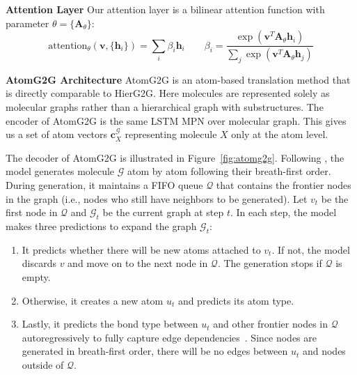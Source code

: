 \documentclass{article} \usepackage{iclr2020_conference,times}
\newcommand{\graph}{\mathcal{G}}
\newcommand{\attention}{\mathrm{attention}}
\newcommand{\set}[1]{\{ #1 \}}
\def\vc{{\bm{c}}}
\def\vh{{\bm{h}}}
\def\vv{{\bm{v}}}
\def\mA{{\bm{A}}}
\def\gQ{{\mathcal{Q}}}
\begin{document}
\textbf{Attention Layer } Our attention layer is a bilinear attention function with parameter $\theta=\set{\mA_\theta}$:
\begin{equation}
    \attention_{\theta}(\vv, \set{\vh_i}) = \sum_i \beta_i \vh_i  \qquad \beta_i = \frac{\exp(\vv^T \mA_\theta \vh_i)}{\sum_j \exp(\vv^T \mA_\theta \vh_j)}
\end{equation}

\textbf{AtomG2G Architecture } AtomG2G is an atom-based translation method that is directly comparable to HierG2G. Here molecules are represented solely as molecular graphs rather than a hierarchical graph with substructures. The encoder of AtomG2G is the same LSTM MPN over molecular graph. This gives us a set of atom vectors $\vc_X^\graph$ representing molecule $X$ only at the atom level.

The decoder of AtomG2G is illustrated in Figure~\ref{fig:atomg2g}. Following \citet{you2018graphrnn,liu2018constrained}, the model generates molecule $\graph$ atom by atom following their breath-first order. During generation, it maintains a FIFO queue $\gQ$ that contains the frontier nodes in the graph (i.e., nodes who still have neighbors to be generated). 
Let $v_t$ be the first node in $\gQ$ and $\graph_t$ be the current graph at step $t$. In each step, the model makes three predictions to expand the graph $\graph_t$:
\begin{enumerate}[leftmargin=*,topsep=0pt,itemsep=0pt]
\item It predicts whether there will be new atoms attached to $v_t$. If not, the model discards $v$ and move on to the next node in $\gQ$. The generation stops if $\gQ$ is empty.
\item Otherwise, it creates a new atom $u_t$ and predicts its atom type.
\item Lastly, it predicts the bond type between $u_t$ and other frontier nodes in $\gQ$ autoregressively to fully capture edge dependencies~\citep{you2018graphrnn}. Since nodes are generated in breath-first order, there will be no edges between $u_t$ and nodes outside of $\gQ$.
\end{enumerate}
\end{document}
